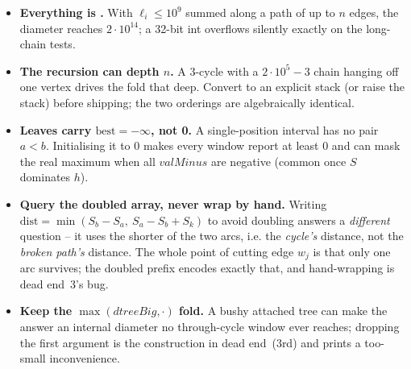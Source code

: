 \begin{hardeningbox}
\begin{itemize}[nosep,leftmargin=1.4em]
  \item \textbf{Everything is .}  With \(\ell_i\le 10^{9}\) summed along
        a path of up to \(n\) edges, the diameter reaches \(2\cdot 10^{14}\); a 32-bit
        int overflows silently exactly on the long-chain tests.
  \item \textbf{The  recursion can depth \(n\).}  A 3-cycle with a
        \(2\cdot 10^{5}{-}3\) chain hanging off one vertex drives the fold that deep.
        Convert to an explicit stack (or raise the stack) before shipping; the two
        orderings are algebraically identical.
  \item \textbf{Leaves carry \(\mathrm{best}=-\infty\), not 0.}  A single-position
        interval has no pair \(a<b\).  Initialising it to 0 makes every window report
        at least 0 and can mask the real maximum when all \(\mathit{valMinus}\) are
        negative (common once \(S\) dominates \(h\)).
  \item \textbf{Query the doubled array, never wrap by hand.}  Writing
        \(\mathrm{dist}=\min(S_b-S_a,\ S_a-S_b{+}S_k)\) to avoid doubling answers a
        \emph{different} question -- it uses the shorter of the two arcs, i.e. the
        \emph{cycle's} distance, not the \emph{broken path's} distance.  The whole
        point of cutting edge \(w_j\) is that only one arc survives; the doubled
        prefix encodes exactly that, and hand-wrapping is dead end~3's bug.
  \item \textbf{Keep the \(\max(\mathit{dtreeBig},\cdot)\) fold.}  A bushy attached tree
        can make the answer an internal diameter no through-cycle window ever
        reaches; dropping the first argument is the construction in dead
        end~(3rd) and prints a too-small inconvenience.
\end{itemize}
\end{hardeningbox}


